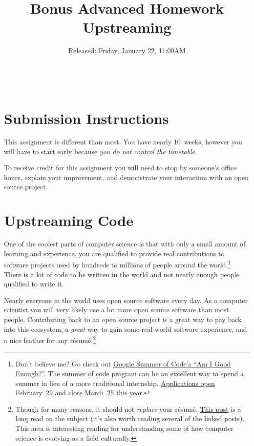 \documentclass{article}
\begin{document}
\fancyfoot[C]{\color{gray} \thepage~/~\pageref*{LastPage}}
\pagestyle{fancyplain}


\title{\textbf{Bonus Advanced Homework\\Upstreaming}}
\author{Released: Friday, January 22, 11:00AM}
\date{
\textbf{\color{red}{Milestone~1 (Must start by) Friday, March 18}}\\
~\\
\textbf{\color{red}{Due: Before lecture on Friday, April 8}}
}
\maketitle


\section*{Submission Instructions}
This assignment is different than most. You have nearly 10~weeks, however you
will have to start early because \emph{you do not control the timetable}.

\medskip
\noindent
To receive credit for this assignment you will need to stop by someone's
office hours, explain your improvement, and demonstrate your interaction with
an open source project.

\section{Upstreaming Code}

One of the coolest parts of computer science is that with only a small amount
of learning and experience, you are qualified to provide real contributions
to software projects used by hundreds to millions of people around the
world.\footnote{%
  Don't believe me? Go check out
  \href{http://write.flossmanuals.net/gsocstudentguide/am-i-good-enough/}{Google
  Summer of Code's ``Am I Good Enough?''}. The summer of code program can be
  an excellent way to spend a summer in lieu of a more traditional internship.
  \href{https://developers.google.com/open-source/gsoc/timeline}
  {Applications open February~29 and close March~25 this year}.
}
There is a lot of code to be written in the world and not nearly enough people
qualified to write it.

Nearly everyone in the world uses open source software every day. As a
computer scientist you will very likely use a lot more open source software
than most people.
Contributing back to an open source project is a great way to pay back into
this ecosystem, a \emph{great} way to gain some real-world software
experience, and a nice feather for any r\'esum\'e.\footnote{%
  Though for many reasons, it should not \emph{replace} your r\'esum\'e.
  \href{https://blog.jcoglan.com/2013/11/15/why-github-is-not-your-cv/}
  {This post} is a long read on the subject (it's also worth reading several
  of the linked posts). This area is interesting reading for understanding
  some of how computer science is evolving as a field culturally.
}
\end{document}
